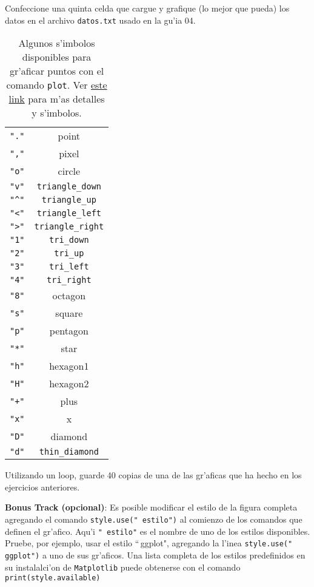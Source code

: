 \documentclass[11pt]{exam}
\begin{document}
\begin{questions}
\item Confeccione una quinta celda que cargue y grafique (lo mejor que pueda) los datos en el archivo \texttt{datos.txt} usado en la gu'ia 04.%
\begin{table}
\begin{center}
\begin{tabular}{cc}
\verb|"."|	& point \\
\verb|","| & pixel \\
\verb|"o"|	& circle \\
\verb|"v"|	& \verb|triangle_down| \\
\verb|"^"|	& \verb|triangle_up| \\
\verb|"<"|	& \verb|triangle_left| \\
\verb|">"|	& \verb|triangle_right| \\
\verb|"1"|	& \verb|tri_down| \\
\verb|"2"|	& \verb|tri_up| \\
\verb|"3"|	& \verb|tri_left| \\
\verb|"4"|	& \verb|tri_right| \\
\verb|"8"|	& octagon \\
\verb|"s"|	& square \\
\verb|"p"|	& pentagon \\
\verb|"*"|	& star \\
\verb|"h"|	& hexagon1 \\
\verb|"H"|	& hexagon2 \\
\verb|"+"|	& plus \\
\verb|"x"|	& x \\
\verb|"D"|	& diamond \\
\verb|"d"|	& \verb|thin_diamond| 
\end{tabular}
\caption{Algunos s'imbolos disponibles para gr'aficar puntos con el comando \texttt{plot}. Ver \href{http://matplotlib.org/api/markers_api.html}{este link} para m'as detalles y s'imbolos.}
\label{t}
\end{center}
\end{table}

\item Utilizando un loop, guarde 40 copias de una de las gr'aficas que ha hecho en los ejercicios anteriores.

\item \textbf{Bonus Track (opcional)}: Es posible modificar el estilo de la figura completa agregando el comando \texttt{style.use("\,\!estilo")} al comienzo de los comandos que definen el gr'afico. Aqu'i \texttt{"\,\!estilo"} es el nombre de uno de los estilos disponibles. Pruebe, por ejemplo, usar el estilo ``\,\!ggplot", agregando la l'inea \texttt{style.use("\,\!ggplot")} a uno de sus gr'aficos. Una lista completa de los estilos predefinidos en su instalalci'on de \texttt{Matplotlib} puede obtenerse con el comando \texttt{print(style.available)}


\end{questions}
\end{document}
